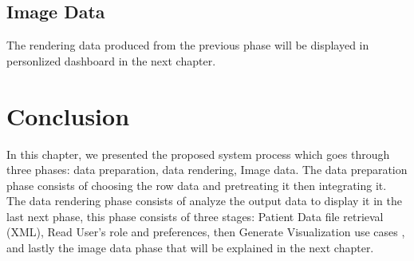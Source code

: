 \subsection{Image Data}
The rendering data produced from the previous phase will be displayed in  personlized dashboard in the next chapter.
\section{Conclusion}
In this chapter, we presented the proposed system process which goes through three phases: data preparation, data rendering, Image data. The data preparation phase consists of choosing the row data and pretreating it then integrating it. The data rendering phase consists of analyze the output data to display it in the last next phase,  this phase consists of three stages:  Patient Data file retrieval (XML), Read User’s role and preferences, then Generate Visualization use cases , and lastly the image data phase that will be explained in the next chapter. 
